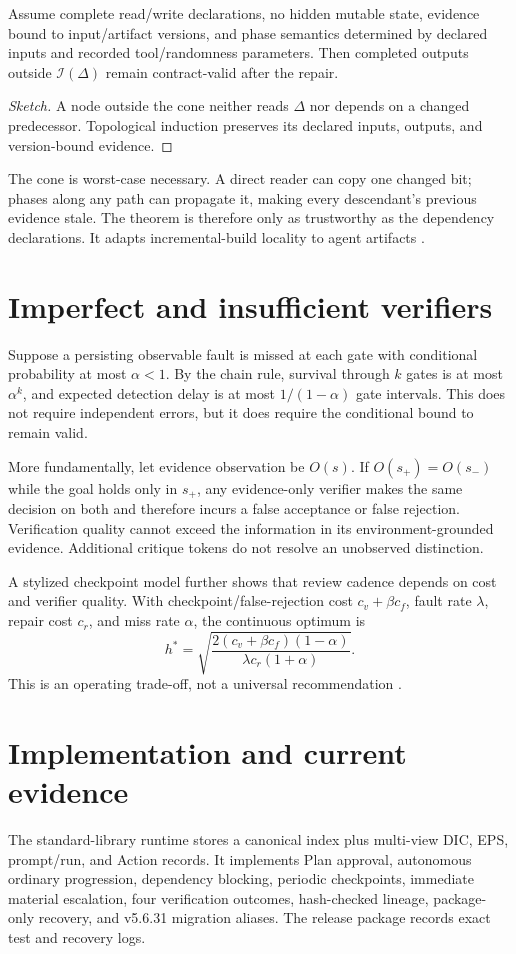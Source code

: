 \documentclass{article}
\begin{document}
\begin{theorem}
Assume complete read/write declarations, no hidden mutable state, evidence bound to input/artifact versions, and phase semantics determined by declared inputs and recorded tool/randomness parameters. Then completed outputs outside $\mathcal I(\Delta)$ remain contract-valid after the repair.
\end{theorem}
\begin{proof}[Sketch]
A node outside the cone neither reads $\Delta$ nor depends on a changed predecessor. Topological induction preserves its declared inputs, outputs, and version-bound evidence.
\end{proof}
The cone is worst-case necessary. A direct reader can copy one changed bit; phases along any path can propagate it, making every descendant's previous evidence stale. The theorem is therefore only as trustworthy as the dependency declarations. It adapts incremental-build locality to agent artifacts \citep{mokhov2018build,acar2009selfadjusting}.

\section{Imperfect and insufficient verifiers}
Suppose a persisting observable fault is missed at each gate with conditional probability at most $\alpha<1$. By the chain rule, survival through $k$ gates is at most $\alpha^k$, and expected detection delay is at most $1/(1-\alpha)$ gate intervals. This does not require independent errors, but it does require the conditional bound to remain valid.

More fundamentally, let evidence observation be $O(s)$. If $O(s_+)=O(s_-)$ while the goal holds only in $s_+$, any evidence-only verifier makes the same decision on both and therefore incurs a false acceptance or false rejection. Verification quality cannot exceed the information in its environment-grounded evidence. Additional critique tokens do not resolve an unobserved distinction.

A stylized checkpoint model further shows that review cadence depends on cost and verifier quality. With checkpoint/false-rejection cost $c_v+\beta c_f$, fault rate $\lambda$, repair cost $c_r$, and miss rate $\alpha$, the continuous optimum is
\[
h^*=\sqrt{\frac{2(c_v+\beta c_f)(1-\alpha)}{\lambda c_r(1+\alpha)}}.
\]
This is an operating trade-off, not a universal recommendation \citep{young1974first,daly2006higher}.

\section{Implementation and current evidence}
The standard-library runtime stores a canonical index plus multi-view DIC, EPS, prompt/run, and Action records. It implements Plan approval, autonomous ordinary progression, dependency blocking, periodic checkpoints, immediate material escalation, four verification outcomes, hash-checked lineage, package-only recovery, and v5.6.31 migration aliases. The release package records exact test and recovery logs.
\end{document}

